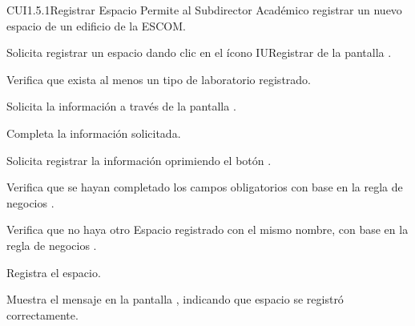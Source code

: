 \begin{UseCase}{CUI1.5.1}{Registrar Espacio}{	
	Permite al Subdirector Académico registrar un nuevo espacio de un edificio de la ESCOM.
}
\end{UseCase}

\begin{UCtrayectoria}
	\UCpaso [\UCactor] Solicita registrar un espacio dando clic en el ícono  IURegistrar 
	de la pantalla . 
	
	\UCpaso [\UCsist] Verifica que exista al menos un tipo de laboratorio registrado. 

	\UCpaso[\UCsist] Solicita la información a través de la pantalla .
	
	\UCpaso [\UCactor] Completa la información solicitada. \label{CUI1.5.1:CompletaInfo}
	
	\UCpaso [\UCactor] Solicita registrar la información oprimiendo el botón . 
	
	\UCpaso [\UCsist] Verifica que se hayan completado los campos obligatorios con base en la regla de negocios . 
		
	\UCpaso [\UCsist] Verifica que no haya otro Espacio registrado con el mismo nombre, con base en la regla de negocios . 
	
	\UCpaso [\UCsist] Registra el espacio.
	
	\UCpaso [\UCsist] Muestra el mensaje  en la pantalla , indicando que espacio se registró correctamente.	
	
\end{UCtrayectoria}

